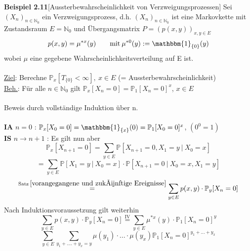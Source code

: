 \textbf{Beispiel 2.11}[Aussterbewahrscheinlichkeit von Verzweigungsprozessen]
Sei $(X_{n})_{n \in \mathbb{N}_{0}}$ ein Verzweigungsprozess, d.h. $(X_{n})_{n \in \mathbb{N}_{0}}$ ist eine Markovkette mit Zustandsraum $E = \mathbb{N}_{0}$ und Übergangsmatrix $P = (p(x,y))_{x,y \in E}$
\begin{equation*}
p(x,y) = \mu^{*x}(y) \qquad \mathrm{mit} \: \mu^{*0}(y) := \mathbbm{1}_{\lbrace 0 \rbrace}(y)
\end{equation*}
wobei $\mu$ eine gegebene Wahrscheinlichkeitsverteilung auf E ist.
\\
\\
\underline{Ziel}: Berechne $\mathbb{P}_{x}[T_{\lbrace 0 \rbrace} < \infty ], \: x \in E$ (= Aussterbewahrscheinlichkeit)
\\
\underline{Beh.}: Für alle $n \in \mathbb{N}_{0}$ gilt $\mathbb{P}_{x}[X_{n} = 0] = \mathbb{P}_{1}[X_{n} = 0]^{x}$, $x \in E$
\\
\\
Beweis durch vollständige Induktion über n.
\\
\\
\textbf{IA} $n=0$ : $\mathbb{P}_{x}[X_{0} = 0] = \mathbbm{1}_{\lbrace x \rbrace}(0) = \mathbb{P}_{1}[X_{0} = 0]^{x}$, $(0^{0} = 1)$
\\
\textbf{IS} $n \to n+1$ : Es gilt nun aber
\begin{equation*}
\mathbb{P}_{x}[X_{n+1} = 0] = \sum_{y \in E} \mathbb{P}[X_{n+1} = 0, X_{1} = y \: | \: X_{0} = x]
\end{equation*}
\begin{equation*}
=\sum_{y \in E} \mathbb{P}[X_{1} = y \: | \: X_{0} = x] \cdot \mathbb{P}[X_{n+1} = 0 \: | \: X_{0} = x, X_{1} = y ]
\end{equation*}
\begin{equation*}
\stackrel{\mathrm{Satz} \: \ref{vorangegangene und zukünftige Ereignisse}}{=}   \sum_{y \in E} p(x,y) \cdot \mathbb{P}_{y}[X_{n} = 0]
\end{equation*}
Nach Induktionsvoraussetzung gilt weiterhin
\begin{equation*}
\sum_{y \in E} p(x,y) \cdot \mathbb{P}_{y}[X_{n} = 0] \stackrel{\mathrm{IV}}{=}  \sum_{y \in E} \mu^{*x}(y) \cdot \mathbb{P}_{1}[X_{n} = 0]^{y}
\end{equation*}
\begin{equation*}
\sum_{y \in E} \sum_{y_{1} +....+ y_{x} = y} \mu(y_{1}) \cdot ... \cdot \mu(y_{x}) \mathbb{P}_{1}[X_{n} = 0]^{y_{1}+...+y_{x}}
\end{equation*}
